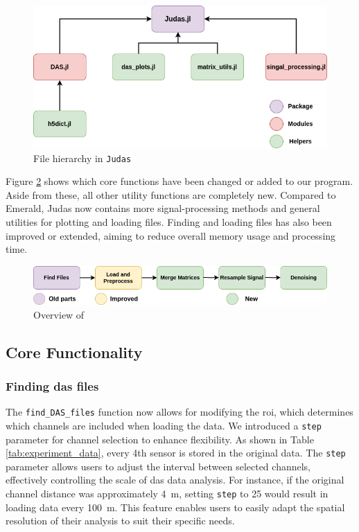 \begin{figure}[!h]
    \centering
    \includegraphics[scale=.5]{figures/judas_overview.png}
    \caption{File hierarchy in \texttt{Judas}}
    \label{fig:judasoverview}
\end{figure}

Figure \ref{fig:apiflow} shows which core functions have been changed or added to our program. Aside from these, all other utility functions are completely new. Compared to Emerald, Judas now contains more signal-processing methods and general utilities for plotting and loading files. Finding and loading files has also been improved or extended, aiming to reduce overall memory usage and processing time.

\begin{figure}[!h]
    \centering
    \includegraphics[scale=0.5]{figures/dataflow.png}
    \caption{Overview of }
    \label{fig:apiflow}
\end{figure}


\subsection{Core Functionality}

\subsubsection{Finding \acrshort{das} files}

The \texttt{find\_DAS\_files} function now allows for modifying the \acrfull{roi}, which determines which channels are included when loading the data. We introduced a \texttt{step} parameter for channel selection to enhance flexibility. As shown in Table \ref{tab:experiment_data}, every 4th sensor is stored in the original data. The \texttt{step} parameter allows users to adjust the interval between selected channels, effectively controlling the scale of \acrshort{das} data analysis. For instance, if the original channel distance was approximately \qty{4}{\meter}, setting \texttt{step} to 25 would result in loading data every \qty{100}{\meter}. This feature enables users to easily adapt the spatial resolution of their analysis to suit their specific needs.

